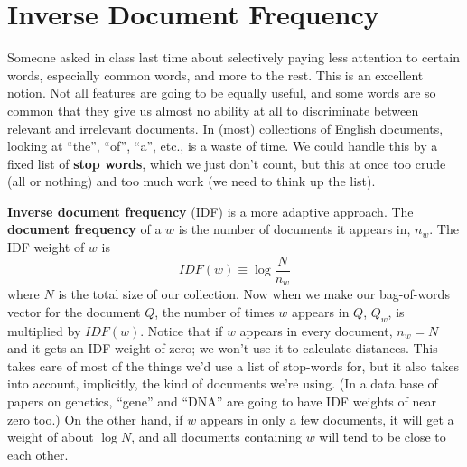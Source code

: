 \documentclass{article}
\begin{document}
%

\section{Inverse Document Frequency}

Someone asked in class last time about selectively paying less attention to
certain words, especially common words, and more to the rest.  This is an
excellent notion.  Not all features are going to be equally useful, and some
words are so common that they give us almost no ability at all to discriminate
between relevant and irrelevant documents.  In (most) collections of English
documents, looking at ``the'', ``of'', ``a'', etc., is a waste of time.  We
could handle this by a fixed list of {\bf stop words}, which we just don't
count, but this at once too crude (all or nothing) and too much work (we need
to think up the list).

{\bf Inverse document frequency} (IDF) is a more adaptive approach.  The {\bf
  document frequency} of a $w$ is the number of documents it appears in, $n_w$.
The IDF weight of $w$ is 
\[
IDF(w) \equiv \log{\frac{N}{n_w}}
\]
where $N$ is the total size of our collection.  Now when we make our
bag-of-words vector for the document $Q$, the number of times $w$ appears in
$Q$, $Q_w$, is multiplied by $IDF(w)$.  Notice that if $w$ appears in every
document, $n_w = N$ and it gets an IDF weight of zero; we won't use it to
calculate distances.  This takes care of most of the things we'd use a list of
stop-words for, but it also takes into account, implicitly, the kind of
documents we're using.  (In a data base of papers on genetics, ``gene'' and
``DNA'' are going to have IDF weights of near zero too.)  On the other hand, if
$w$ appears in only a few documents, it will get a weight of about $\log{N}$,
and all documents containing $w$ will tend to be close to each other.
\end{document}
